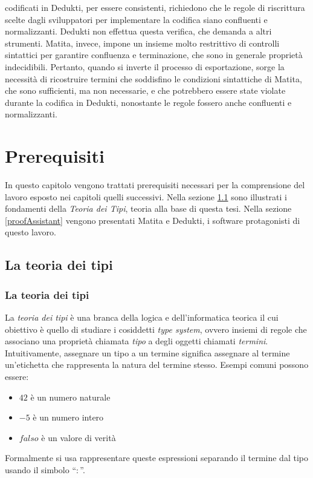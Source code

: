 \documentclass[12pt,a4paper]{mimosis}
\begin{document}
codificati in Dedukti, per essere consistenti, richiedono che le regole di riscrittura
scelte dagli sviluppatori per implementare la codifica siano confluenti e normalizzanti.
Dedukti non effettua questa verifica, che demanda a altri strumenti. Matita, invece, impone
un insieme molto restrittivo di controlli sintattici per garantire confluenza e terminazione,
che sono in generale proprietà indecidibili. Pertanto, quando si inverte il processo di
esportazione, sorge la necessità di ricostruire termini che soddisfino le condizioni 
sintattiche di Matita, che sono sufficienti, ma non necessarie, e che potrebbero essere
state violate durante la codifica in Dedukti, nonostante le regole fossero anche confluenti
e normalizzanti.

\chapter{Prerequisiti}
In questo capitolo vengono trattati prerequisiti necessari per la
comprensione del lavoro esposto nei capitoli quelli successivi. Nella sezione \ref{teoriaDeiTipi}
sono illustrati i fondamenti della \textit{Teoria dei Tipi}, teoria alla base 
di questa tesi. Nella sezione \ref{proofAssistant} vengono presentati Matita e Dedukti,
i software protagonisti di questo lavoro.

\section{La teoria dei tipi} \label{teoriaDeiTipi}
\subsection{La teoria dei tipi}
La \textit{teoria dei tipi} è una branca della logica e dell'informatica teorica il
cui obiettivo è quello di studiare i cosiddetti \textit{type system}, ovvero
insiemi di regole che associano una proprietà chiamata \textit{tipo} a degli oggetti
chiamati \textit{termini}. Intuitivamente, assegnare un tipo a un termine significa
assegnare al termine un'etichetta che rappresenta la natura del termine stesso.
Esempi comuni possono essere: 
\begin{itemize}
  \item $42$ è un numero naturale 
  \item $-5$ è un numero intero
  \item $falso$ è un valore di verità 
\end{itemize}

Formalmente si usa rappresentare queste espressioni separando il termine dal tipo usando
il simbolo ``$:$''. 
\end{document}
